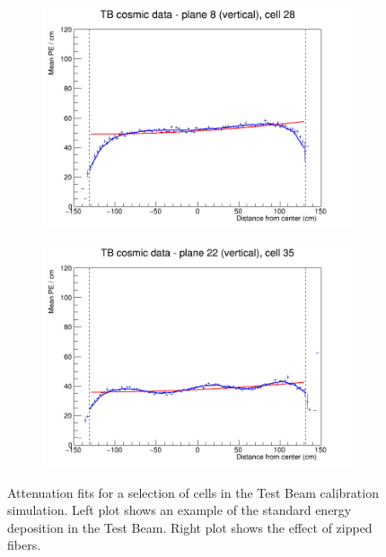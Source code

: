\documentclass[12pt,a4paper]{article}
\begin{document}
\begin{figure}[h]
  \begin{subfigure}{0.5\textwidth}
    \includegraphics[width=\linewidth]{RelativeCalibrationResults/p2_008_028.png}
  \end{subfigure}
  \begin{subfigure}{0.5\textwidth}
    \includegraphics[width=\linewidth]{RelativeCalibrationResults/p2_022_035.png}
  \end{subfigure}
  \caption{Attenuation fits for a selection of cells in the Test Beam calibration simulation. Left plot shows an example of the standard energy deposition in the Test Beam. Right plot shows the effect of zipped fibers.}
  \label{figAttenfitResultsPerio2_ZippedFibers}
\end{figure}
\end{document}
